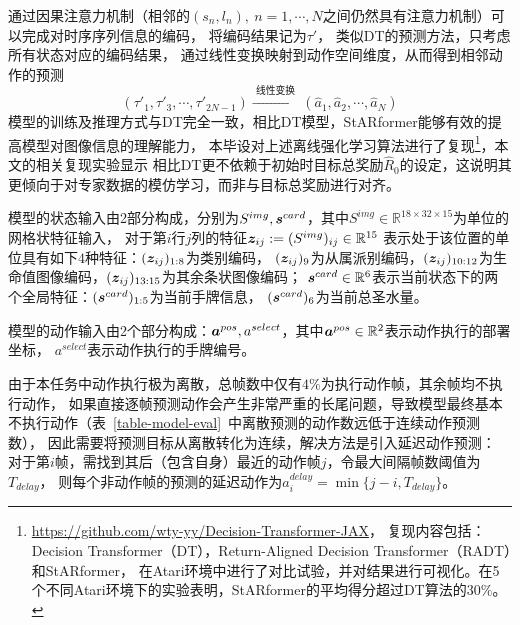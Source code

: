 通过因果注意力机制（相邻的$(s_n,l_n),~n=1,\cdots,N$之间仍然具有注意力机制）可以完成对时序序列信息的编码，
将编码结果记为$\tau'$，
类似DT的预测方法，只考虑所有状态对应的编码结果，
通过线性变换映射到动作空间维度，从而得到相邻动作的预测
\begin{equation}
  (\tau'_1,\tau'_3,\cdots, \tau'_{2N-1})\xrightarrow{\text{~线性变换~}}
  (\hat{a}_1,\hat{a}_2,\cdots, \hat{a}_{N})
\end{equation}
模型的训练及推理方式与DT完全一致，相比DT模型，StARformer能够有效的提高模型对图像信息的理解能力，
本毕设对上述离线强化学习算法进行了复现\footnote{\url{https://github.com/wty-yy/Decision-Transformer-JAX}，
复现内容包括：Decision Transformer（DT），Return-Aligned Decision Transformer（RADT）和StARformer，
在Atari环境中进行了对比试验，并对结果进行可视化。在5个不同Atari环境下的实验表明，StARformer的平均得分超过DT算法的$30\%$。}，本文的相关复现实验显示
相比DT更不依赖于初始时目标总奖励$\hat{R}_0$的设定，这说明其更倾向于对专家数据的模仿学习，而非与目标总奖励进行对齐。

模型的状态输入由2部分构成，分别为$S^{img}, \boldsymbol{s}^{card}$，其中$S^{img}\in\mathbb{R}^{18\times 32\times 15}$为单位的网格状特征输入，
对于第$i$行$j$列的特征$\boldsymbol{z}_{ij}:=(S^{img})_{ij}\in\mathbb{R}^{15}$
表示处于该位置的单位具有如下$4$种特征：$(\boldsymbol{z}_{ij})_{1:8}$为类别编码，
$(\boldsymbol{z}_{ij})_9$为从属派别编码，$(\boldsymbol{z}_{ij})_{10:12}$为生命值图像编码，$(\boldsymbol{z}_{ij})_{13:15}$为其余条状图像编码；
$\boldsymbol{s}^{card}\in\mathbb{R}^6$表示当前状态下的两个全局特征：$(\boldsymbol{s}^{card})_{1:5}$为当前手牌信息，
$(\boldsymbol{s}^{card})_6$为当前总圣水量。

模型的动作输入由2个部分构成：$\boldsymbol{a}^{pos}, a^{select}$，其中$\boldsymbol{a}^{pos}\in\mathbb{R}^2$表示动作执行的部署坐标，
$a^{select}$表示动作执行的手牌编号。

\label{sec-target}
由于本任务中动作执行极为离散，总帧数中仅有$4\%$为执行动作帧，其余帧均不执行动作，
如果直接逐帧预测动作会产生非常严重的长尾问题，导致模型最终基本不执行动作（表~\ref{table-model-eval}~中离散预测的动作数远低于连续动作预测数），
因此需要将预测目标从离散转化为连续，解决方法是引入延迟动作预测：
对于第$i$帧，需找到其后（包含自身）最近的动作帧$j$，令最大间隔帧数阈值为$T_{delay}$，
则每个非动作帧的预测的延迟动作为$a^{delay}_{i} = \min\{j-i, T_{delay}\}$。


